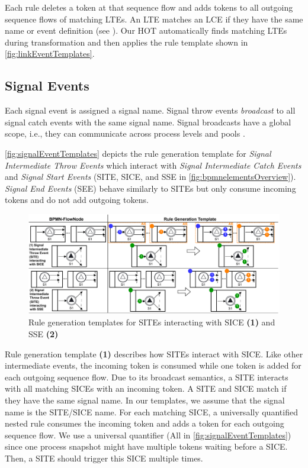 \documentclass{lmcs} %
\begin{document}
Each rule deletes a token at that sequence flow and adds tokens to all outgoing sequence flows of matching LTEs.
An LTE matches an LCE if they have the same name or event definition (see \cite{objectmanagementgroupBusinessProcessModel2013}).
Our HOT automatically finds matching LTEs during transformation and then applies the rule template shown in \autoref{fig:linkEventTemplates}.

\subsection{Signal Events}
Each signal event is assigned a signal name.
Signal throw events \textit{broadcast} to all signal catch events with the same signal name.
Signal broadcasts have a global scope, i.e., they can communicate across process levels and pools \cite{objectmanagementgroupBusinessProcessModel2013}.

\autoref{fig:signalEventTemplates} depicts the rule generation template for \textit{Signal Intermediate Throw Events} which interact with \textit{Signal Intermediate Catch Events} and \textit{Signal Start Events} (\textsf{SITE}, \textsf{SICE}, and \textsf{SSE} in \autoref{fig:bpmnelementsOverview}).
\textit{Signal End Events} (\textsf{SEE}) behave similarly to SITEs but only consume incoming tokens and do not add outgoing tokens.

\begin{figure}[ht]
    \centering
    \includegraphics[width=1\textwidth]{images/signal_rule_template.pdf}
    \caption{Rule generation templates for SITEs interacting with SICE \textbf{(1)} and SSE \textbf{(2)}}
    \label{fig:signalEventTemplates}
\end{figure}

Rule generation template \textbf{(1)} describes how SITEs interact with SICE.
Like other intermediate events, the incoming token is consumed while one token is added for each outgoing sequence flow.
Due to its broadcast semantics, a SITE interacts with all matching SICEs with an incoming token.
A SITE and SICE match if they have the same signal name.
In our templates, we assume that the signal name is the SITE/SICE name.
For each matching SICE, a universally quantified nested rule consumes the incoming token and adds a token for each outgoing sequence flow.
We use a universal quantifier (\textsf{All} in \autoref{fig:signalEventTemplates}) since one process snapshot might have multiple tokens waiting before a SICE.
Then, a SITE should trigger this SICE multiple times.
\end{document}
